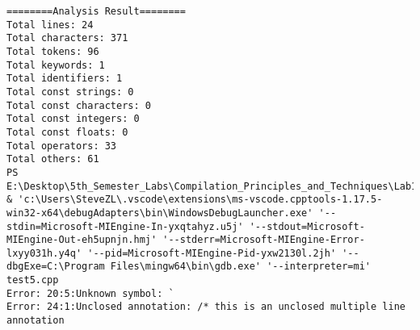 \documentclass[lang=cn,11pt,a4paper]{paper}
\begin{document}
\begin{lstlisting}
========Analysis Result========
Total lines: 24
Total characters: 371
Total tokens: 96
Total keywords: 1
Total identifiers: 1
Total const strings: 0
Total const characters: 0
Total const integers: 0
Total const floats: 0
Total operators: 33
Total others: 61
PS E:\Desktop\5th_Semester_Labs\Compilation_Principles_and_Techniques\Lab1>  & 'c:\Users\SteveZL\.vscode\extensions\ms-vscode.cpptools-1.17.5-win32-x64\debugAdapters\bin\WindowsDebugLauncher.exe' '--stdin=Microsoft-MIEngine-In-yxqtahyz.u5j' '--stdout=Microsoft-MIEngine-Out-eh5upnjn.hmj' '--stderr=Microsoft-MIEngine-Error-lxyy031h.y4q' '--pid=Microsoft-MIEngine-Pid-yxw2130l.2jh' '--dbgExe=C:\Program Files\mingw64\bin\gdb.exe' '--interpreter=mi'
test5.cpp
Error: 20:5:Unknown symbol: `
Error: 24:1:Unclosed annotation: /* this is an unclosed multiple line annotation



\end{lstlisting}
\end{document}
